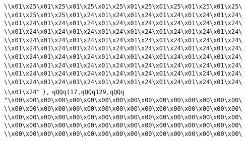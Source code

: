 \verb|\\x01\x25\x01\x25\x01\x25\x01\x25\x01\x25\x01\x25\x01\x25\x01\x25\|\newline
\verb|\\x01\x25\x01\x25\x01\x24\x01\x24\x01\x24\x01\x24\x01\x24\x01\x24\|\newline
\verb|\\x01\x24\x01\x24\x01\x24\x01\x24\x01\x24\x01\x24\x01\x24\x01\x24\|\newline
\verb|\\x01\x24\x01\x24\x01\x24\x01\x24\x01\x24\x01\x24\x01\x24\x01\x24\|\newline
\verb|\\x01\x24\x01\x24\x01\x24\x01\x24\x01\x24\x01\x24\x01\x24\x01\x24\|\newline
\verb|\\x01\x24\x01\x24\x01\x24\x01\x24\x01\x24\x01\x24\x01\x24\x01\x24\|\newline
\verb|\\x01\x24\x01\x24\x01\x24\x01\x24\x01\x24\x01\x24\x01\x24\x01\x24\|\newline
\verb|\\x01\x24\x01\x24\x01\x24\x01\x24\x01\x24\x01\x24\x01\x24\x01\x24\|\newline
\verb|\\x01\x24\x01\x24\x01\x24\x01\x24\x01\x24\x01\x24\x01\x24\x01\x24\|\newline
\verb|\\x01\x24\x01\x24\x01\x24\x01\x24\x01\x24\x01\x24\x01\x24\x01\x24\|\newline
\verb|\\x01\x24"|\newline
\verb|),|\newline
\verb|qQQq(17,qQQq129,qQQq|\newline
\verb|"\x00\x00\x00\x00\x00\x00\x00\x00\x00\x00\x00\x00\x00\x00\x00\x00\|\newline
\verb|\\x00\x00\x00\x00\x00\x00\x00\x00\x00\x00\x00\x00\x00\x00\x00\x00\|\newline
\verb|\\x00\x00\x00\x00\x00\x00\x00\x00\x00\x00\x00\x00\x00\x00\x00\x00\|\newline
\verb|\\x00\x00\x00\x00\x00\x00\x00\x00\x00\x00\x00\x00\x00\x00\x00\x00\|\newline
\verb|\\x00\x00\x00\x00\x00\x00\x00\x00\x00\x00\x00\x00\x00\x00\x00\x00\|\newline
